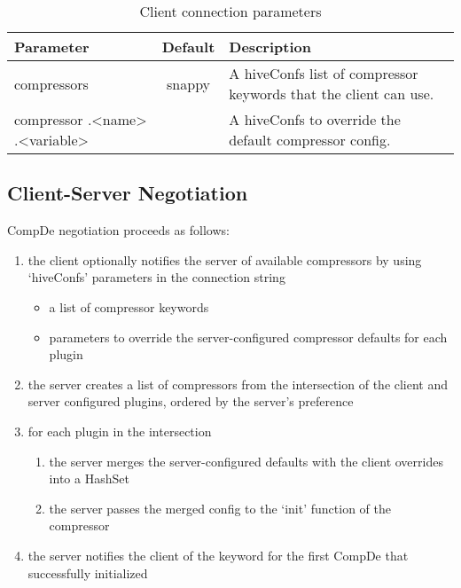 \documentclass[11pt,a4paper]{article}
\begin{document}
		\begin{table}[H]
			\begin{tabular}{| p{3cm} | c | p{6.5cm} |} \hline
				
				\textbf{Parameter} & \textbf{Default} & \textbf{Description} \\ \hline
				compressors
				& snappy
				& A hiveConfs list of compressor keywords that the client can use. 
				\\ \hline
				
				compressor\linebreak
				.\textless name\textgreater\linebreak
				.\textless variable\textgreater
				&
				& A hiveConfs to override the default compressor config. 
				\\ \hline
				
			\end{tabular}
			\caption{Client connection parameters}
		\end{table}
		
	\subsection{Client-Server Negotiation}
		
		CompDe negotiation proceeds as follows:
		
		\begin{enumerate}
			
			\item the client optionally notifies the server of available compressors by using `hiveConfs' parameters in the connection string
			\begin{itemize}
				\item a list of compressor keywords
				\item parameters to override the server-configured compressor defaults for each plugin
			\end{itemize}
			
			\item the server creates a list of compressors from the intersection of the client and server configured plugins, ordered by the server's preference
			
			\item for each plugin in the intersection
			\begin{enumerate}[1.]
				\item the server merges the server-configured defaults with the client overrides into a HashSet
				\item the server passes the merged config to the `init' function of the compressor
			\end{enumerate}
			
			\item the server notifies the client of the keyword for the first CompDe that successfully initialized
		\end{enumerate}
		
\end{document}
